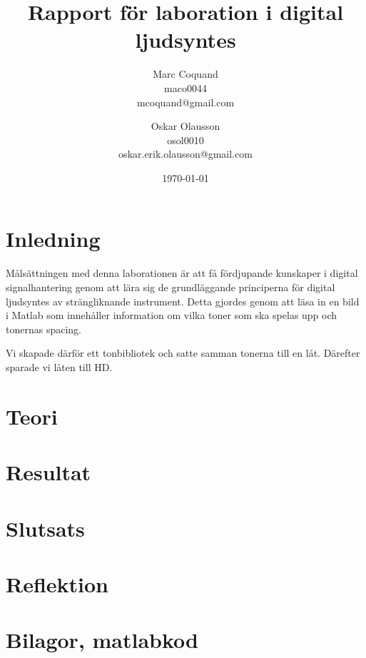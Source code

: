\documentclass[12pt]{article}
\title{Rapport för laboration i digital ljudsyntes}
\author{
    Marc Coquand \\
    maco0044 \\
    mcoquand@gmail.com\\
    \and
    Oskar Olausson \\
    osol0010 \\
    oskar.erik.olausson@gmail.com\\
}
\date{\today}
\begin{document}
\lstset{language=Matlab}
\maketitle
\tableofcontents

\newpage

\section{Inledning}

Målsättningen med denna laborationen är att få fördjupande kunskaper i digital
signalhantering genom att lära sig de grundläggande principerna för digital
ljudsyntes av strängliknande instrument. Detta gjordes genom att läsa in en bild
i Matlab som innehåller information om vilka toner som ska spelas upp och
tonernas spacing. 

Vi skapade därför ett tonbibliotek och satte samman tonerna till en låt.
Därefter sparade vi låten till HD.

\section{Teori}




\section{Resultat}

\section{Slutsats}

\section{Reflektion}

\section{Bilagor, matlabkod}
\label{sec:bilagor}

%
\end{document}
